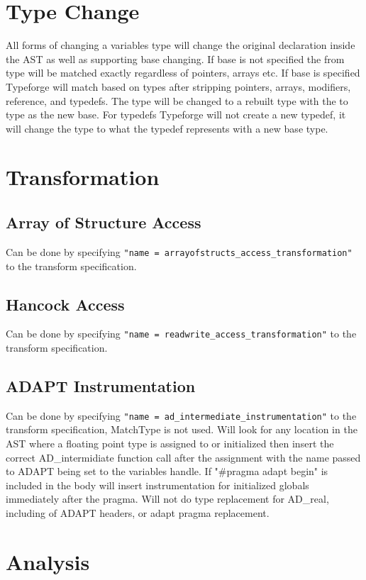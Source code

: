 \documentclass[natbib]{article}
\begin{document}
\section{Type Change} \label{change}
All forms of changing a variables type will change the original declaration inside the AST 
as well as supporting base changing. If base is not specified the from type will be matched 
exactly regardless of pointers, arrays etc. If base is specified Typeforge will match based 
on types after stripping pointers, arrays, modifiers, reference, and typedefs. The type will 
be changed to a rebuilt type with the to type as the new base. For typedefs Typeforge will 
not create a new typedef, it will change the type to what the typedef represents with a 
new base type.

\section{Transformation} \label{transform}
\subsection{Array of Structure Access}
Can be done by specifying \verb+"name = arrayofstructs_access_transformation"+ to the transform 
specification.
\subsection{Hancock Access}
Can be done by specifying \verb+"name = readwrite_access_transformation"+ to the transform 
specification.
\subsection{ADAPT Instrumentation}
Can be done by specifying \verb+"name = ad_intermediate_instrumentation"+ to the transform 
specification, MatchType is not used. Will look for any location in the AST where a floating 
point type is assigned to or initialized then insert the correct AD\_intermidiate function 
call after the assignment with the name passed to ADAPT being set to the variables handle. 
If "\#pragma adapt begin" is included in the body will insert instrumentation for initialized 
globals immediately after the pragma. Will not do type replacement for AD\_real, including 
of ADAPT headers, or adapt pragma replacement.

\section{Analysis} \label{analysis}
\end{document}
